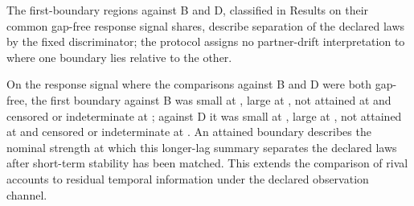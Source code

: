 
The first-boundary regions against B and D, classified in Results on their common gap-free response signal shares, describe separation of the declared laws by the fixed discriminator; the protocol assigns no partner-drift interpretation to where one boundary lies relative to the other. %

On the  response signal  where the comparisons against B and D were both gap-free, the first boundary against B was small at , large at , not attained at  and censored or indeterminate at ; against D it was small at , large at , not attained at  and censored or indeterminate at . %
An attained boundary describes the nominal strength at which this longer-lag summary separates the declared laws after short-term stability has been matched. This extends the comparison of rival accounts to residual temporal information under the declared observation channel.

